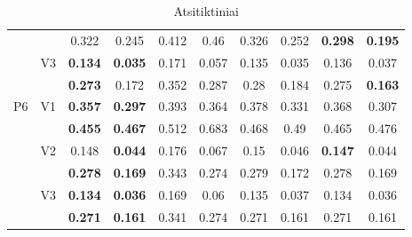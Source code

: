 \documentclass[12pt,a4paper]{article}
\begin{document}
\begin{sidewaystable}[ht]
{\begin{tabular}{cc|cc|cc|cc|cc|}
   &  & 0.322 & 0.245 & 0.412 & 0.46 & 0.326 & 0.252 & \textbf{0.298} & \textbf{0.195} \\ 
   & \multirow{2}{*}{V3} & \textbf{0.134} & \textbf{0.035} & 0.171 & 0.057 & 0.135 & 0.035 & 0.136 & 0.037 \\ 
   &  & \textbf{0.273} & 0.172 & 0.352 & 0.287 & 0.28 & 0.184 & 0.275 & \textbf{0.163} \\ 
   \hline \hline\multirow{6}{*}{P6} & \multirow{2}{*}{V1} & \textbf{0.357} & \textbf{0.297} & 0.393 & 0.364 & 0.378 & 0.331 & 0.368 & 0.307 \\ 
   &  & \textbf{0.455} & \textbf{0.467} & 0.512 & 0.683 & 0.468 & 0.49 & 0.465 & 0.476 \\ 
   & \multirow{2}{*}{V2} & 0.148 & \textbf{0.044} & 0.176 & 0.067 & 0.15 & 0.046 & \textbf{0.147} & 0.044 \\ 
   &  & \textbf{0.278} & \textbf{0.169} & 0.343 & 0.274 & 0.279 & 0.172 & 0.278 & 0.169 \\ 
   & \multirow{2}{*}{V3} & \textbf{0.134} & \textbf{0.036} & 0.169 & 0.06 & 0.135 & 0.037 & 0.134 & 0.036 \\ 
   &  & \textbf{0.271} & \textbf{0.161} & 0.341 & 0.274 & 0.271 & 0.161 & 0.271 & 0.161 \\ 
   \hline
\end{tabular}
}
\caption{Atsitiktiniai}
\end{sidewaystable}
\end{document}
